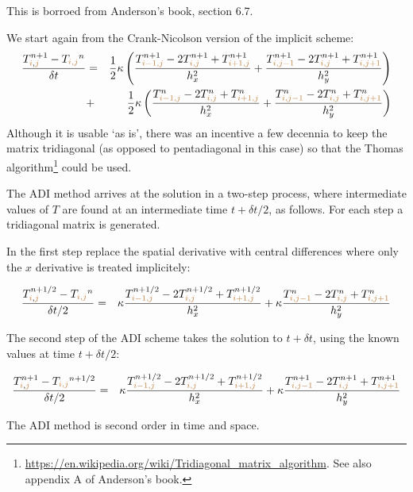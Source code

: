 This is borroed from Anderson's book, section 6.7.

We start again from the Crank-Nicolson version of the implicit scheme:
\begin{eqnarray}
\frac{T_{{\color{brown}i},{\color{brown}j}}^{n+1}-T_{\color{brown}i,j}^n}{\delta t}
&=& \frac12 \kappa
\left(
\frac{ T_{{\color{brown}i-1,j}}^{n+1}-2T_{{\color{brown}i,j}}^{n+1}+T_{{\color{brown}i+1,j}}^{n+1} }{h_x^2} + 
\frac{ T_{{\color{brown}i,j-1}}^{n+1}-2T_{{\color{brown}i,j}}^{n+1}+T_{{\color{brown}i,j+1}}^{n+1} }{h_y^2}
\right) \nonumber\\
&+& \frac12 \kappa
\left(
\frac{ T_{{\color{brown}i-1,j}}^{n}-2T_{{\color{brown}i,j}}^{n}+T_{{\color{brown}i+1,j}}^{n} }{h_x^2} + 
\frac{ T_{{\color{brown}i,j-1}}^{n}-2T_{{\color{brown}i,j}}^{n}+T_{{\color{brown}i,j+1}}^{n} }{h_y^2}
\right)
\end{eqnarray}
Although it is usable `as is', there was an incentive a few decennia to keep the matrix 
tridiagonal (as opposed to pentadiagonal in this case) so that the Thomas algorithm\footnote{
\url{https://en.wikipedia.org/wiki/Tridiagonal_matrix_algorithm}.
See also appendix A of Anderson's book.} could be used.

The ADI method arrives at the solution in a two-step process, where intermediate values
of $T$ are found at an intermediate time $t+\delta t/2$, as follows. For each step a tridiagonal 
matrix is generated.

In the first step replace the spatial derivative with central differences where only the $x$ derivative is treated 
implicitely:

\begin{eqnarray}
\frac{T_{{\color{brown}i},{\color{brown}j}}^{n+1/2}-T_{\color{brown}i,j}^n}{\delta t/2}
&=& \kappa \frac{ T_{{\color{brown}i-1,j}}^{n+1/2}-2T_{{\color{brown}i,j}}^{n+1/2}+T_{{\color{brown}i+1,j}}^{n+1/2} }{h_x^2} 
+\kappa \frac{ T_{{\color{brown}i,j-1}}^{n}-2T_{{\color{brown}i,j}}^{n}+T_{{\color{brown}i,j+1}}^{n} }{h_y^2}
\end{eqnarray}

The second step of the ADI scheme takes the solution to $t+\delta t$, using the known values 
at time $t+\delta t/2$:

\begin{eqnarray}
\frac{T_{{\color{brown}i},{\color{brown}j}}^{n+1}-T_{\color{brown}i,j}^{n+1/2}}{\delta t/2}
&=& \kappa \frac{ T_{{\color{brown}i-1,j}}^{n+1/2}-2T_{{\color{brown}i,j}}^{n+1/2}+T_{{\color{brown}i+1,j}}^{n+1/2} }{h_x^2} 
+\kappa 
\frac{ T_{{\color{brown}i,j-1}}^{n+1}-2T_{{\color{brown}i,j}}^{n+1}+T_{{\color{brown}i,j+1}}^{n+1} }{h_y^2}
\end{eqnarray}

The ADI method is second order in time and space.





 
